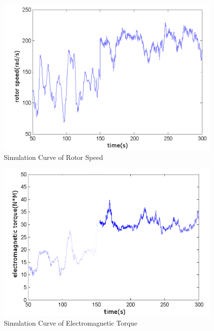 \documentclass[english]{cccconf}
\begin{document}
\begin{figure}[!htb]
  \centering
  \includegraphics[width=\hsize]{4.png}
  \caption{Simulation Curve of Rotor Speed}
  \label{fig4}
\end{figure}

\begin{figure}[!htb]
  \centering
  \includegraphics[width=\hsize]{5.png}
  \caption{Simulation Curve of Electromagnetic Torque}
  \label{fig5}
\end{figure}
\end{document}
